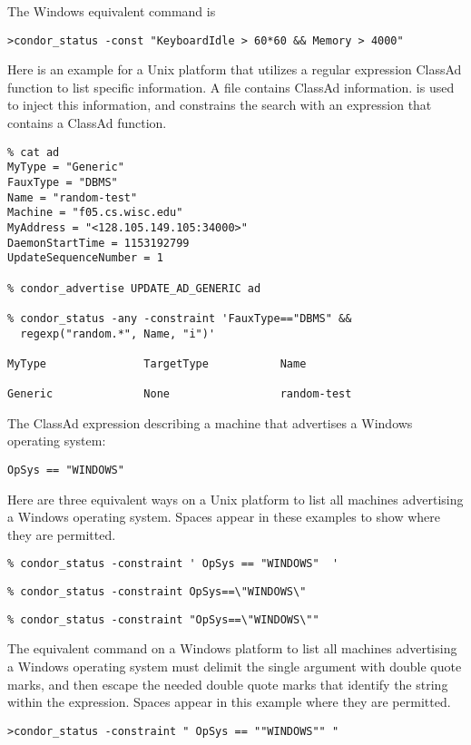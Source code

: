 The Windows equivalent command is
\footnotesize
\begin{verbatim}
>condor_status -const "KeyboardIdle > 60*60 && Memory > 4000"
\end{verbatim}
\normalsize

Here is an example for a Unix platform that utilizes a regular expression
ClassAd function to list specific information.
A file contains ClassAd information.
 is used to inject this information,
and  constrains the search with an expression
that contains a ClassAd function.

\footnotesize
\begin{verbatim}
% cat ad
MyType = "Generic"
FauxType = "DBMS"
Name = "random-test"
Machine = "f05.cs.wisc.edu"
MyAddress = "<128.105.149.105:34000>"
DaemonStartTime = 1153192799
UpdateSequenceNumber = 1

% condor_advertise UPDATE_AD_GENERIC ad

% condor_status -any -constraint 'FauxType=="DBMS" && 
  regexp("random.*", Name, "i")'

MyType               TargetType           Name                          

Generic              None                 random-test                   

\end{verbatim}
\normalsize

The ClassAd expression describing a machine that
advertises a Windows operating system:
\footnotesize
\begin{verbatim}
OpSys == "WINDOWS"
\end{verbatim}
\normalsize
Here are three equivalent ways on a Unix platform to list all machines
advertising a Windows operating system.
Spaces appear in these examples to show where they are permitted.
\footnotesize
\begin{verbatim}
% condor_status -constraint ' OpSys == "WINDOWS"  '
\end{verbatim}
\normalsize
\footnotesize
\begin{verbatim}
% condor_status -constraint OpSys==\"WINDOWS\"
\end{verbatim}
\normalsize
\footnotesize
\begin{verbatim}
% condor_status -constraint "OpSys==\"WINDOWS\""
\end{verbatim}
\normalsize

The equivalent command on a Windows platform to list all machines
advertising a Windows operating system must delimit the single
argument with double quote marks, and then escape the needed
double quote marks that identify the string within the expression. 
Spaces appear in this example where they are permitted.
\footnotesize
\begin{verbatim}
>condor_status -constraint " OpSys == ""WINDOWS"" "
\end{verbatim}
\normalsize

